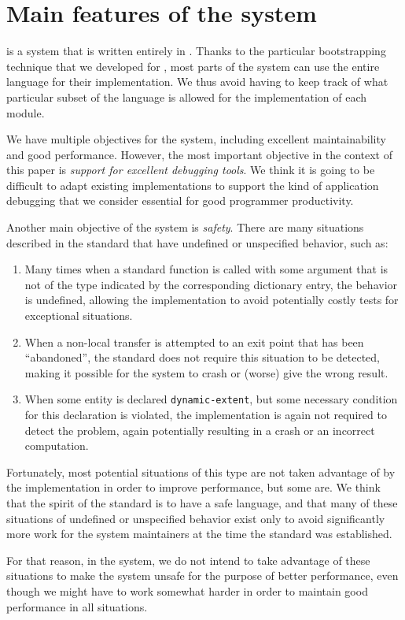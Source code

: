 \section{Main features of the \sicl{} system}
\label{sec-sicl-features}

\sicl{} is a system that is written entirely in \commonlisp{}.  Thanks
to the particular bootstrapping technique
\cite{durand_irene_2019_2634314} that we developed for \sicl{}, most
parts of the system can use the entire language for their
implementation.  We thus avoid having to keep track of what particular
subset of the language is allowed for the implementation of each
module.

We have multiple objectives for the \sicl{} system, including
excellent maintainability and good performance.  However, the most
important objective in the context of this paper is \emph{support for
  excellent debugging tools}.  We think it is going to be difficult to
adapt existing \commonlisp{} implementations to support the kind of
application debugging that we consider essential for good programmer
productivity.

Another main objective of the \sicl{} system is \emph{safety}.  There
are many situations described in the \commonlisp{} standard that have
undefined or unspecified behavior, such as:

\begin{enumerate}
\item Many times when a standard function is called with some argument
  that is not of the type indicated by the corresponding dictionary
  entry, the behavior is undefined, allowing the implementation to
  avoid potentially costly tests for exceptional situations.
\item When a non-local transfer is attempted to an exit point that has
  been ``abandoned'', the standard does not require this situation to
  be detected, making it possible for the system to crash or (worse)
  give the wrong result.
\item When some entity is declared \texttt{dynamic-extent}, but some
  necessary condition for this declaration is violated, the
  implementation is again not required to detect the problem, again
  potentially resulting in a crash or an incorrect computation.
\end{enumerate}

Fortunately, most potential situations of this type are not taken
advantage of by the implementation in order to improve performance,
but some are.  We think that the spirit of the \commonlisp{} standard
is to have a safe language, and that many of these situations of
undefined or unspecified behavior exist only to avoid significantly
more work for the system maintainers at the time the standard was
established.

For that reason, in the \sicl{} system, we do not intend to take
advantage of these situations to make the system unsafe for the
purpose of better performance, even though we might have to work
somewhat harder in order to maintain good performance in all
situations.
